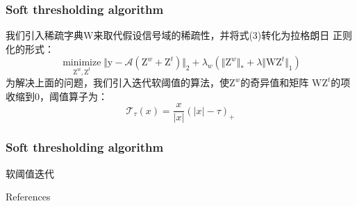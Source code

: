 \documentclass[12pt]{beamer}
\begin{document}
\begin{frame}
  \frametitle{Soft thresholding algorithm}
  我们引入稀疏字典$\text{W}$来取代假设信号域的稀疏性，并将式(3)转化为拉格朗日
  正则化的形式：
  \begin{equation}
\mathop\text{minimize}\limits_{\text{Z}^{w},\text{Z}^{t}} \Vert \text{y}-\mathcal{A}(\text{Z}^{w}+\text{Z}^{t})\Vert_{2}+\lambda_{w}(\Vert \text{Z}^{w}\Vert_{*}+\lambda\Vert \text{WZ}^{t}\Vert_{1})
  \end{equation}
  为解决上面的问题，我们引入迭代软阈值的算法，使$\text{Z}^w$的奇异值和矩阵
  $\text{WZ}^t$的项收缩到0，阈值算子为：
  \begin{equation*}
	\mathcal{T}_{\tau}(x)=\frac{x}{\vert x\vert }(\vert x\vert -\tau)_{+}
  \end{equation*}
\end{frame}
\begin{frame}
  \frametitle{Soft thresholding algorithm}
  \scriptsize
  \begin{algorithm}[H]  
	\caption{软阈值迭代}
	\label{alg:1}
	\begin{algorithmic}[1]
	  \ELSE
	  \ENDIF
	\end{algorithmic}
  \end{algorithm}
\end{frame}
\begin{frame}[allowframebreaks]{References}
  \footnotesize
   
   
\end{frame}
\end{document}
